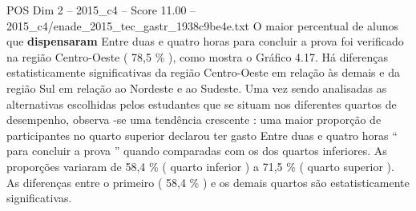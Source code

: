 \begin{textsample}{POS Dim 2 – 2015\_c4 – Score 11.00 – 2015\_c4/enade\_2015\_tec\_gastr\_1938c9be4e.txt}
O maior percentual de alunos que \textbf{dispensaram} Entre duas e quatro horas para concluir a prova foi verificado na região Centro-Oeste ( 78,5 \% ), como mostra o Gráfico 4.17.
Há diferenças estatisticamente significativas da região Centro-Oeste em relação às demais e da região Sul em relação ao Nordeste e ao Sudeste.
Uma vez sendo analisadas as alternativas escolhidas pelos estudantes que se situam nos diferentes quartos de desempenho, observa -se uma tendência crescente : uma maior proporção de participantes no quarto superior declarou ter gasto Entre duas e quatro horas “ para concluir a prova ” quando comparadas com os dos quartos inferiores.
As proporções variaram de 58,4 \% ( quarto inferior ) a 71,5 \% ( quarto superior ).
As diferenças entre o primeiro ( 58,4 \% ) e os demais quartos são estatisticamente significativas.

\end{textsample}
